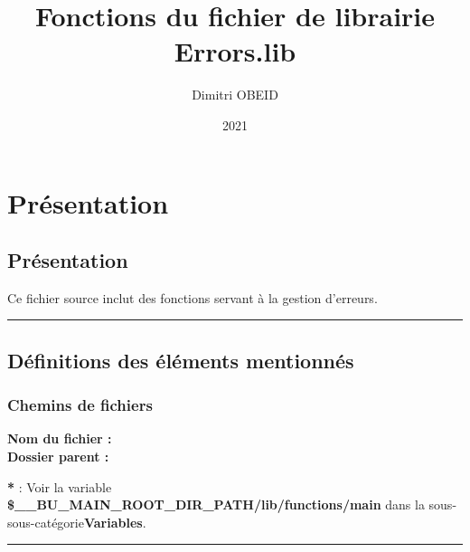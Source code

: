 \documentclass[a4paper,10pt]{article}
\title{\color{red}Fonctions du fichier de librairie \color{lime}Errors.lib}\color{white}
\author{Dimitri OBEID}
\date{2021}
\begin{document}
 \maketitle
 \tableofcontents
 \newpage

\color{red}
\section{Présentation}\color{white}

\color{green}
\subsection{Présentation}\color{white}

\begin{justify}
    Ce fichier source inclut des fonctions servant à la gestion d'erreurs.
\end{justify}




\color{green}\par\noindent\rule{\textwidth}{0.4pt}\color{white}

\color{green}
\subsection{Définitions des éléments mentionnés}\color{white}

\color{blue}
\subsubsection{Chemins de fichiers}\color{white}

\textbf{Nom du fichier : \color{lime}}\\[1\baselineskip]

\textbf{Dossier parent : \color{lime}}\\[1\baselineskip]

\begin{justify}
    \textbf{*} : Voir la variable \textbf{\color{orange}\$\_\_BU\_MAIN\_ROOT\_DIR\_PATH/lib/functions/main} dans la sous-sous-catégorie\linebreak \textbf{\color{blue}Variables}.
\end{justify}



\color{lime}\par\noindent\rule{\textwidth}{0.4pt}\color{white}\\[1\baselineskip]
\end{document}
